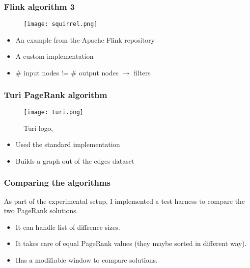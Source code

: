 \begin{frame}
\frametitle{Flink algorithm 3}
\begin{figure}

	\texttt{[image: squirrel.png]}

\end{figure}

\begin{itemize}
\item An example from the Apache Flink repository
\item A custom implementation
\item \# input nodes != \# output nodes $\rightarrow$ filters
\end{itemize}
\end{frame}


\begin{frame}
\frametitle{Turi PageRank algorithm}
\begin{figure}
	\centering
	\texttt{[image: turi.png]}
	\caption{Turi logo, \cite{turi}}
\end{figure}
\begin{itemize}
\item Used the standard implementation
\item Builds a graph out of the edges dataset
\end{itemize}


\end{frame}

\begin{frame}
\frametitle{Comparing the algorithms}
As part of the experimental setup, I implemented a test harness to compare the two PageRank solutions.
\begin{itemize}
	\item It can handle list of diffrence sizes.
	\item It takes care of equal PageRank values (they maybe sorted in different way).
	\item Has a modifiable window to compare solutions.
\end{itemize}
\end{frame}
